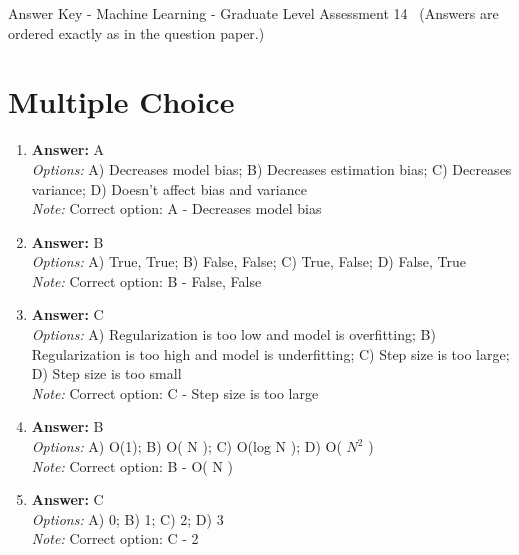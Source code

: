 \documentclass[12pt]{article}
\begin{document}
\begin{center}
Answer Key - Machine Learning - Graduate Level Assessment 14 \
\small (Answers are ordered exactly as in the question paper.)
\end{center}

\section*{Multiple Choice}
\begin{enumerate}[label=\arabic*.]
\item \textbf{Answer:} A
\\ \textit{Options:} A) Decreases model bias; B) Decreases estimation bias; C) Decreases variance; D) Doesn't affect bias and variance
\\ \textit{Note:} Correct option: A - Decreases model bias
\item \textbf{Answer:} B
\\ \textit{Options:} A) True, True; B) False, False; C) True, False; D) False, True
\\ \textit{Note:} Correct option: B - False, False
\item \textbf{Answer:} C
\\ \textit{Options:} A) Regularization is too low and model is overfitting; B) Regularization is too high and model is underfitting; C) Step size is too large; D) Step size is too small
\\ \textit{Note:} Correct option: C - Step size is too large
\item \textbf{Answer:} B
\\ \textit{Options:} A) O(1); B) O( N ); C) O(log N ); D) O( $N^2$ )
\\ \textit{Note:} Correct option: B - O( N )
\item \textbf{Answer:} C
\\ \textit{Options:} A) 0; B) 1; C) 2; D) 3
\\ \textit{Note:} Correct option: C - 2
\end{enumerate}
\end{document}
